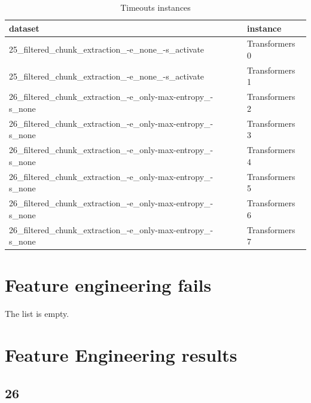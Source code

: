 \begin{table}[h]
\centering
\begin{tabular}{ll}
\hline
dataset & instance \\ 
\hline
25\_filtered\_chunk\_extraction\_-e\_none\_-s\_activate & Transformers 0 \\ 
25\_filtered\_chunk\_extraction\_-e\_none\_-s\_activate & Transformers 1 \\ 
26\_filtered\_chunk\_extraction\_-e\_only-max-entropy\_-s\_none & Transformers 2 \\ 
26\_filtered\_chunk\_extraction\_-e\_only-max-entropy\_-s\_none & Transformers 3 \\ 
26\_filtered\_chunk\_extraction\_-e\_only-max-entropy\_-s\_none & Transformers 4 \\ 
26\_filtered\_chunk\_extraction\_-e\_only-max-entropy\_-s\_none & Transformers 5 \\ 
26\_filtered\_chunk\_extraction\_-e\_only-max-entropy\_-s\_none & Transformers 6 \\ 
26\_filtered\_chunk\_extraction\_-e\_only-max-entropy\_-s\_none & Transformers 7 \\ 
\hline
\end{tabular}
\caption{Timeouts instances}
\label{tab:timeouts}
\end{table}

\section{Feature engineering fails}

\label{sec:annexe:feature_engineering_fails}

The list is empty.

\section{Feature Engineering results}

\label{sec:annexe:feature_engineering_results}

\subsection{26}

